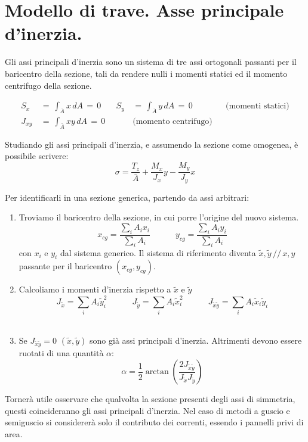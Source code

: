 \section{Modello di trave. Asse principale d'inerzia.}

Gli assi principali d'inerzia sono un sistema di tre assi ortogonali passanti per il baricentro della sezione, tali da rendere nulli i momenti statici ed il momento centrifugo della sezione.


\begin{align*}
    S_x \, &=\, \int_{\bar{A}} x \, dA \,=\,0 \quad & S_y \, &=\, \int_{\bar{A}} y \, dA\,=\,0 &&\text{(momenti statici)}\\
    J_{xy} \, &=\, \int_{\bar{A}} xy \, dA\,=\,0 &&\text{(momento centrifugo)}
\end{align*}

Studiando gli assi principali d'inerzia, e assumendo la sezione come omogenea, è possibile scrivere:
\begin{equation*}
        \sigma = \frac{T_z}{\bar{A}} +  \frac{M_x}{J_x}y -\frac{M_y}{J_y}x 
 \end{equation*}

 Per identificarli in una sezione generica, partendo da assi arbitrari:
 \begin{enumerate}
     \item Troviamo il baricentro della sezione, in cui porre l'origine del nuovo sistema.
     \begin{equation*}
     x_{cg} = \frac{\sum_i A_i x_i}{\sum_i A_i} \quad\quad\quad
     y_{cg} = \frac{\sum_i A_i y_i}{\sum_i A_i}
    \end{equation*}
    con $x_i$ e $y_i$ dal sistema generico. Il sistema di riferimento diventa $\tilde{x}, \tilde{y} \,//\,x,y$ passante per il baricentro $(x_{cg},y_{cg})$.\\
    \item Calcoliamo i momenti d'inerzia rispetto a $\tilde{x}$ e $\tilde{y}$
    \begin{equation*}
     J_{\tilde{x}} = \sum_i A_i \tilde{y}_i^2 \quad\quad\quad
     J_{\tilde{y}} = \sum_i A_i \tilde{x}_i^2 \quad\quad\quad
     J_{\tilde{x}\tilde{y}} = \sum_i A_i \tilde{x}_i \tilde{y}_i
    \end{equation*}\\
    \item Se $ J_{\tilde{x}\tilde{y}} = 0$ $(\tilde{x},\tilde{y})$ sono già assi principali d'inerzia. Altrimenti devono essere ruotati di una quantità $\alpha$:
    \begin{equation*}
        \alpha = \frac{1}{2} \arctan\left(\frac{2 J_{\tilde{x}\tilde{y}} }{J_{\tilde{x}} J_{\tilde{y}} }\right)
    \end{equation*}
 \end{enumerate}

 Tornerà utile osservare che qualvolta la sezione presenti degli assi di simmetria, questi coincideranno gli assi principali d'inerzia. Nel caso di metodi a guscio e semiguscio si considererà solo il contributo dei correnti, essendo i pannelli privi di area.


